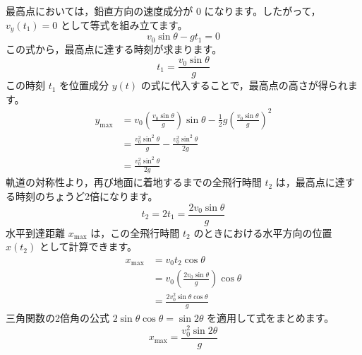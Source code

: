 \begin{solutionparts}
最高点においては，鉛直方向の速度成分が 0 になります。したがって， $v_y(t_1) = 0$ として等式を組み立てます。
\begin{equation*}
v_0 \sin\theta - gt_1 = 0
\end{equation*}
この式から，最高点に達する時刻が求まります。
\begin{equation*}
t_1 = \frac{v_0 \sin\theta}{g}
\end{equation*}
この時刻 $t_1$ を位置成分 $y(t)$ の式に代入することで，最高点の高さが得られます。
\begin{align*}
y_{\text{max}}
  &= v_0\left(\frac{v_0\sin\theta}{g}\right)\sin\theta
   -\frac{1}{2}g\left(\frac{v_0\sin\theta}{g}\right)^2 \\
  &= \frac{v_0^2\sin^2\theta}{g}
   -\frac{v_0^2\sin^2\theta}{2g} \\
  &= \frac{v_0^2\sin^2\theta}{2g}
\end{align*}
軌道の対称性より，再び地面に着地するまでの全飛行時間 $t_2$ は，最高点に達する時刻のちょうど2倍になります。
\begin{equation*}
t_2 = 2t_1 = \frac{2v_0 \sin\theta}{g}
\end{equation*}
水平到達距離 $x_{\text{max}}$ は，この全飛行時間 $t_2$ のときにおける水平方向の位置 $x(t_2)$ として計算できます。
\begin{align*}
x_{\text{max}}
  &= v_0t_2\cos\theta \\
  &= v_0\left(\frac{2v_0\sin\theta}{g}\right)\cos\theta \\
  &= \frac{2v_0^2\sin\theta\cos\theta}{g}
\end{align*}
三角関数の2倍角の公式 $2 \sin\theta \cos\theta = \sin 2\theta$ を適用して式をまとめます。
\begin{equation*}
x_{\text{max}} = \frac{v_0^2 \sin 2\theta}{g}
\end{equation*}

\end{solutionparts}
